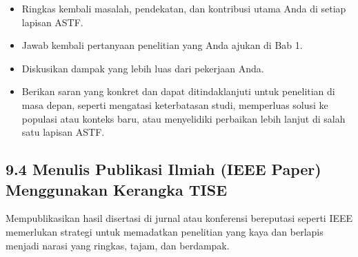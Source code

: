 \documentclass[
  letterpaper,
  DIV=11,
  numbers=noendperiod]{scrreprt}
\providecommand{\tightlist}{%
  \setlength{\itemsep}{0pt}\setlength{\parskip}{0pt}}
\begin{document}
\begin{itemize}
  \begin{itemize}
  \tightlist
  \item
    Ringkas kembali masalah, pendekatan, dan kontribusi utama Anda di
    setiap lapisan ASTF.
  \item
    Jawab kembali pertanyaan penelitian yang Anda ajukan di Bab 1.
  \item
    Diskusikan dampak yang lebih luas dari pekerjaan Anda.
  \item
    Berikan saran yang konkret dan dapat ditindaklanjuti untuk
    penelitian di masa depan, seperti mengatasi keterbatasan studi,
    memperluas solusi ke populasi atau konteks baru, atau menyelidiki
    perbaikan lebih lanjut di salah satu lapisan ASTF.
  \end{itemize}
\end{itemize}

\subsection{\texorpdfstring{\textbf{9.4 Menulis Publikasi Ilmiah (IEEE
Paper) Menggunakan Kerangka
TISE}}{9.4 Menulis Publikasi Ilmiah (IEEE Paper) Menggunakan Kerangka TISE}}\label{menulis-publikasi-ilmiah-ieee-paper-menggunakan-kerangka-tise}

Mempublikasikan hasil disertasi di jurnal atau konferensi bereputasi
seperti IEEE memerlukan strategi untuk memadatkan penelitian yang kaya
dan berlapis menjadi narasi yang ringkas, tajam, dan berdampak.
\end{document}
